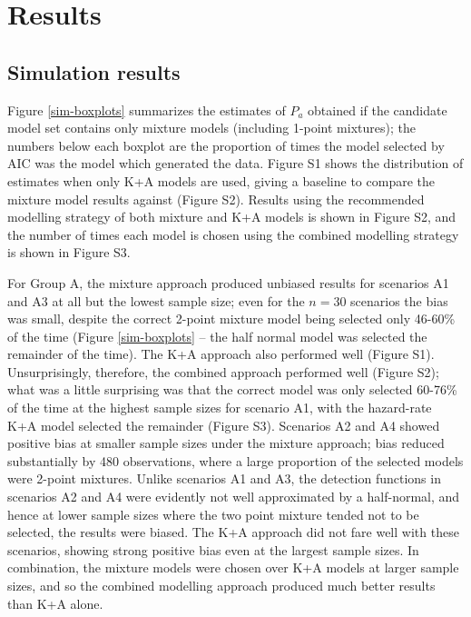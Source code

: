 \documentclass[10pt]{article}
\begin{document}
  
\section*{Results}

\subsection*{Simulation results}

Figure \ref{sim-boxplots} summarizes the estimates of $P_a$ obtained if the candidate model set contains only mixture models (including 1-point mixtures); the numbers below each boxplot are the proportion of times the model selected by AIC was the model which generated the data. Figure S1 shows the distribution of estimates when only K+A models are used, giving a baseline to compare the mixture model results against (Figure S2). Results using the recommended modelling strategy of both mixture and K+A models is shown in Figure S2, and the number of times each model is chosen using the combined modelling strategy is shown in Figure S3.

For Group A, the mixture approach produced unbiased results for scenarios A1 and A3 at all but the lowest sample size; even for the $n=30$ scenarios the bias was small, despite the correct 2-point mixture model being selected only 46-60\% of the time (Figure \ref{sim-boxplots} -- the half normal model was selected the remainder of the time).  The K+A approach also performed well (Figure S1). Unsurprisingly, therefore, the combined approach performed well (Figure S2); what was a little surprising was that the correct model was only selected 60-76\% of the time at the highest sample sizes for scenario A1, with the hazard-rate K+A model selected the remainder (Figure S3). Scenarios A2 and A4 showed positive bias at smaller sample sizes under the mixture approach; bias reduced substantially by 480 observations, where a large proportion of the selected models were 2-point mixtures. Unlike scenarios A1 and A3, the detection functions in scenarios A2 and A4 were evidently not well approximated by a half-normal, and hence at lower sample sizes where the two point mixture tended not to be selected, the results were biased. The K+A approach did not fare well with these scenarios, showing strong positive bias even at the largest sample sizes. In combination, the mixture models were chosen over K+A models at larger sample sizes, and so the combined modelling approach produced much better results than K+A alone.  
\end{document}
